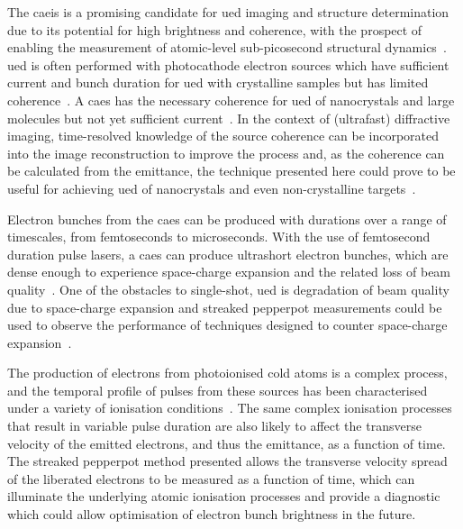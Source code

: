 The \gls{caeis} is a promising candidate for \gls{ued} imaging and structure determination due to its potential for high brightness and coherence, with the prospect of enabling the measurement of atomic-level sub-picosecond structural dynamics~\cite{siwick_atomic-level_2003,putkunz_atom-scale_2012,sparkes_high-coherence_2014}.
\gls{ued} is often performed with photocathode electron sources which have sufficient current and bunch duration for \gls{ued} with crystalline samples but has limited coherence~\cite{van_oudheusden_electron_2007,tokita_single-shot_2009,sciaini_femtosecond_2011}.
A \gls{caes} has the necessary coherence for \gls{ued} of nanocrystals and large molecules but not yet sufficient current~\cite{saliba_spatial_2012,mcculloch_high-coherence_2013}.
In the context of (ultrafast) diffractive imaging, time-resolved knowledge of the source coherence can be incorporated into the image reconstruction to improve the process and, as the coherence can be calculated from the emittance, the technique presented here could prove to be useful for achieving \gls{ued} of nanocrystals and even non-crystalline targets~\cite{flewett_extracting_2009,abbey_lensless_2011}.

Electron bunches from the \gls{caes} can be produced with durations over a range of timescales, from femtoseconds to microseconds.
With the use of femtosecond duration pulse lasers, a \gls{caes} can produce ultrashort electron bunches, which are dense enough to experience space-charge expansion and the related loss of beam quality~\cite{luiten_how_2004,van_oudheusden_compression_2010,thompson_suppression_2016}.
One of the obstacles to single-shot, \gls{ued} is degradation of beam quality due to space-charge expansion and streaked pepperpot measurements could be used to observe the performance of techniques designed to counter space-charge expansion~\cite{thompson_suppression_2016}.

The production of electrons from photoionised cold atoms is a complex process, and the temporal profile of pulses from these sources has been characterised under a variety of ionisation conditions~\cite{speirs_identification_2017}.
The same complex ionisation processes that result in variable pulse duration are also likely to affect the transverse velocity of the emitted electrons, and thus the emittance, as a function of time.
The streaked pepperpot method presented allows the transverse velocity spread of the liberated electrons to be measured as a function of time, which can illuminate the underlying atomic ionisation processes and provide a diagnostic which could allow optimisation of electron bunch brightness in the future.

